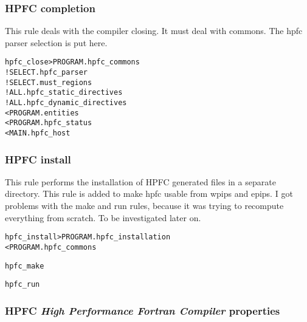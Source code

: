 \documentclass[a4paper]{report}
\newenvironment{PipsMake}{\begin{alltt}}{\end{alltt}}
\begin{document}
\subsubsection{HPFC completion}

This rule deals with the compiler closing. It must deal with commons.
The hpfc parser selection is put here.

\begin{PipsMake}
hpfc_close             > PROGRAM.hpfc_commons
    ! SELECT.hpfc_parser
    ! SELECT.must_regions
    ! ALL.hpfc_static_directives
    ! ALL.hpfc_dynamic_directives
    < PROGRAM.entities
    < PROGRAM.hpfc_status
    < MAIN.hpfc_host
\end{PipsMake}

\subsubsection{HPFC install}

This rule performs the installation of HPFC generated files in a separate
directory. This rule is added to make hpfc usable from wpips and epips. I
got problems with the make and run rules, because it was trying to
recompute everything from scratch. To be investigated later on.

\begin{PipsMake}
hpfc_install            > PROGRAM.hpfc_installation
    < PROGRAM.hpfc_commons

hpfc_make

hpfc_run

\end{PipsMake}

\subsubsection{HPFC {\em High Performance Fortran Compiler} properties}
\end{document}
